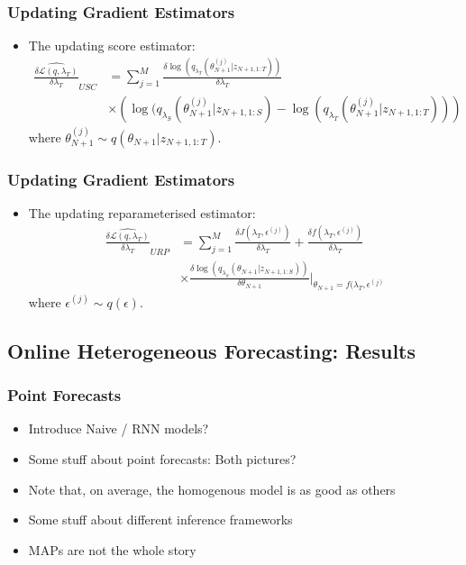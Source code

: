 \documentclass[11pt]{beamer}\usepackage[]{graphicx}\usepackage[]{color}
\begin{document}
\begin{frame}
\frametitle{Updating Gradient Estimators}
\begin{itemize}
\item The updating score estimator:
\begin{align*}
\widehat{\frac{\delta\mathcal{L}(q, \lambda_T)}{\delta \lambda_T}}_{USC} &= \sum_{j = 1}^M \frac{\delta \log(q_{\lambda_T}(\theta_{N+1}^{(j)} | z_{N+1, 1:T}))}{\delta \lambda_T}  \\
&\times \left(\log(q_{\lambda_S}(\theta_{N+1}^{(j)} | z_{N+1, 1:S}) - \log(q_{\lambda_T}(\theta_{N+1}^{(j)} | z_{N+1, 1:T})) \right)
\end{align*}
where $\theta_{N+1}^{(j)} \sim q(\theta_{N+1} | z_{N+1, 1:T})$. 
\end{itemize}
\end{frame}

\begin{frame}
\frametitle{Updating Gradient Estimators}
\begin{itemize}
\item The updating reparameterised estimator:
\begin{align*}
\widehat{\frac{\delta\mathcal{L}(q, \lambda_T)}{\delta \lambda_T}}_{URP} &= \sum_{j = 1}^M \frac{\delta J(\lambda_T, \epsilon^{(j)})}{\delta \lambda_T} + \frac{\delta f(\lambda_T, \epsilon^{(j)})}{\delta \lambda_T} \\
&\times \frac{\delta \log(q_{\lambda_S}(\theta_{N+1} |z_{N+1, 1:S}))}{\delta \theta_{N+1}} \bigg\rvert_{\theta_{N+1} = f(\lambda_T, \epsilon^{(j)}} 
\end{align*}
where $\epsilon^{(j)} \sim q(\epsilon)$.
\end{itemize}
\end{frame}

\begin{frame}
\section{Online Heterogeneous Forecasting: Results}
\frametitle{Point Forecasts}
\begin{itemize}
\item Introduce Naive / RNN models?
\item Some stuff about point forecasts: Both pictures?
\item Note that, on average, the homogenous model is as good as others
\item Some stuff about different inference frameworks
\item MAPs are not the whole story
\end{itemize}
\end{frame}
\end{document}
